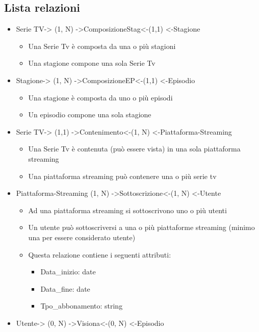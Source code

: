 \documentclass[12pt,a4paper]{article}
\begin{document}
\subsection{Lista relazioni}
\begin{itemize}
    \item Serie TV-> (1, N) ->ComposizioneStag<-(1,1) <-Stagione 
    \begin{itemize}
        \item Una Serie Tv è composta da una o più stagioni
        \item Una stagione compone una sola Serie Tv 
    \end{itemize}
    \item Stagione-> (1, N) ->ComposizioneEP<-(1,1) <-Episodio
    \begin{itemize}
        \item Una stagione è composta da uno o più episodi
        \item Un episodio compone una sola stagione
    \end{itemize}
    \item Serie TV-> (1,1) ->Contenimento<-(1, N) <-Piattaforma-Streaming
    \begin{itemize}
        \item Una Serie Tv è contenuta (può essere vista) in una sola piattaforma streaming
        \item Una piattaforma streaming può contenere una o più serie tv 
    \end{itemize}
    \item Piattaforma-Streaming (1, N) ->Sottoscrizione<-(1, N) <-Utente
    \begin{itemize}
        \item Ad una piattaforma streaming si sottoscrivono uno o più utenti
        \item Un utente può sottoscriversi a una o più piattaforme streaming (minimo una per essere considerato utente)
        \item Questa relazione contiene i seguenti attributi:
        \begin{itemize}
            \item Data\_inizio: date
            \item Data\_fine: date
            \item Tpo\_abbonamento: string
        \end{itemize}
    \end{itemize}
    \item Utente-> (0, N) ->Visiona<-(0, N) <-Episodio

\end{itemize}
\end{document}

